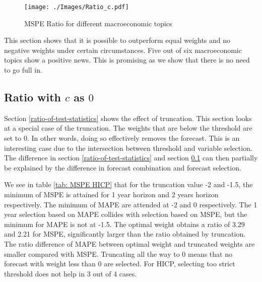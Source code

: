 \documentclass[11pt]{article}
\begin{document}
\begin{figure}[!h]
	\centering
	\texttt{[image: ./Images/Ratio\_c.pdf]}
	\caption{MSPE Ratio for different macroeconomic topics}\label{fig: c Ratio sub}
\end{figure}

This section shows that it is possible to outperform equal weights and no negative weights under certain circumstances. Five out of six macroeconomic topics show a positive news. This is promising as we show that there is no need to go full in.

\subsection{Ratio with $c$ as $0$}\label{ratio-of-mean-squared-prediction-error}
Section \ref{ratio-of-test-statistics} shows the effect of truncation. This section looks at a special case of the truncation. The weights that are below the threshold are set to $0$. In other words, doing so effectively removes the forecast. This is an interesting case due to the intersection between threshold and variable selection. The difference in section \ref{ratio-of-test-statistics} and section \ref{ratio-of-mean-squared-prediction-error} can then partially be explained by the difference in forecast combination and forecast selection.

We see in table \ref{tab: MSPE HICP} that for the truncation value -2 and -1.5, the minimum of MSPE is attained for 1 year horizon and 2 years horizon respectively. The minimum of MAPE are attended at -2 and 0 respectively. The 1 year selection based on MAPE collides with selection based on MSPE, but the minimum for MAPE is not at -1.5. The optimal weight obtains a ratio of 3.29 and 2.21 for MSPE, significantly larger than the ratio obtained by truncation. The ratio difference of MAPE between optimal weight and truncated weights are smaller compared with MSPE. Truncating all the way to 0 means that no forecast with weight less than 0 are selected. For HICP, selecting too strict threshold does not help in 3 out of 4 cases.
\end{document}
